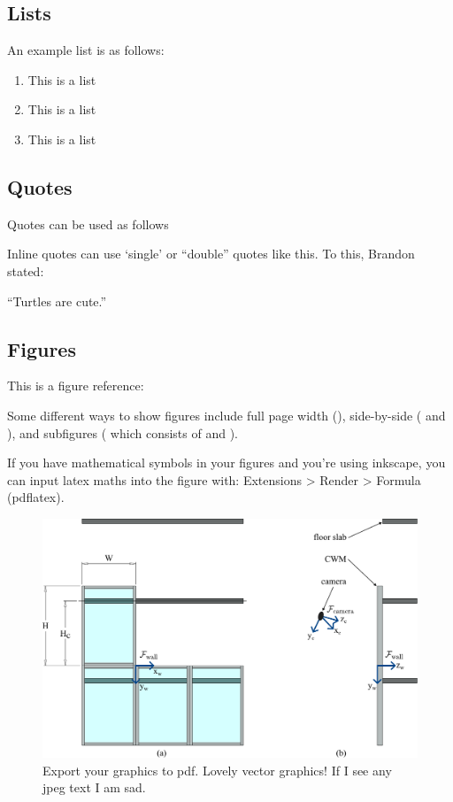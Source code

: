 \subsection{Lists}
An example list is as follows:
\begin{enumerate}[topsep=0pt,beginpenalty=10000,first=\interlinepenalty10000]
    \item This is a list
    \item This is a list
    \item This is a list
\end{enumerate}


\subsection{Quotes}
Quotes can be used as follows

Inline quotes can use `single' or ``double'' quotes like this. To this, Brandon stated:

\vspace*{-\parskip}
\begin{displayquote}
	``Turtles are cute.''
\end{displayquote}


\subsection{Figures}
This is a figure reference: 

Some different ways to show figures include full page width (), side-by-side ( and ), and subfigures ( which consists of  and ).

If you have mathematical symbols in your figures and you're using inkscape, you can input latex maths into the figure with: Extensions > Render > Formula (pdflatex).

\begin{figure}[!htb]
	\centering
	\centerline{\includegraphics[width=\textwidth,keepaspectratio]{Figures/ExampleFigure3.pdf}}
	\caption{Export your graphics to pdf. Lovely vector graphics! If I see any jpeg text I am sad.}
	\label{fig:Example1}
\end{figure}

